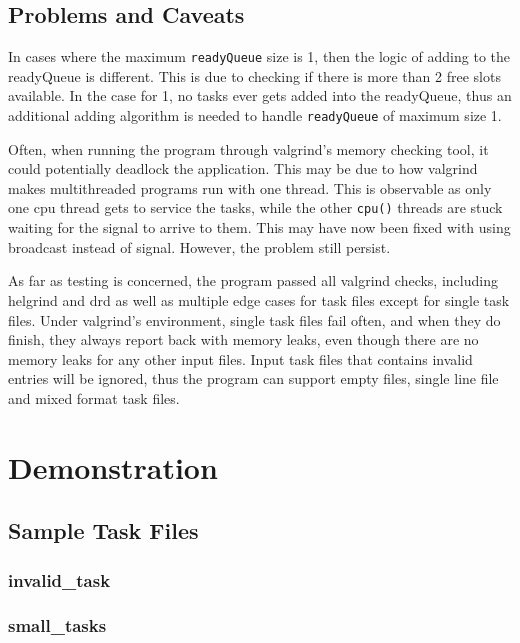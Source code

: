 \documentclass[a4paper, 12pt, titlepage]{article}
\newcommand{\code}[1]{\small\texttt{#1}\normalsize}
\begin{document}
\subsection{Problems and Caveats}
In cases where the maximum \code{readyQueue} size is 1, then the logic of
adding to the readyQueue is different. This is due to checking if there is more
than 2 free slots available. In the case for 1, no tasks ever gets added into
the readyQueue, thus an additional adding algorithm is needed to handle
\code{readyQueue} of maximum size 1.

Often, when running the program through valgrind's memory checking tool, it
could potentially deadlock the application. This may be due to how valgrind
makes multithreaded programs run with one thread. This is observable as only
one cpu thread gets to service the tasks, while the other \code{cpu()} threads
are stuck waiting for the signal to arrive to them. This may have now been
fixed with using broadcast instead of signal. However, the problem still
persist.

As far as testing is concerned, the program passed all valgrind checks,
including helgrind and drd as well as multiple edge cases for task files except
for single task files. Under valgrind's environment, single task files fail
often, and when they do finish, they always report back with memory leaks, even
though there are no memory leaks for any other input files. Input task files
that contains invalid entries will be ignored, thus the program can support
empty files, single line file and mixed format task files.

\newpage
\section{Demonstration}
\subsection{Sample Task Files}
\subsubsection{invalid\_task}


\subsubsection{small\_tasks}

\end{document}
